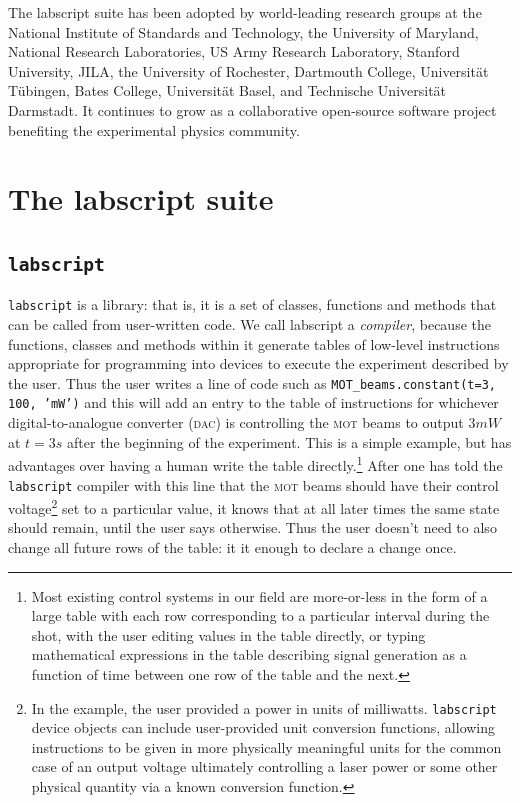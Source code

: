 The labscript suite has been adopted by world-leading research groups at the National Institute of Standards and Technology, the University of Maryland, National Research Laboratories, US Army Research Laboratory, Stanford University, JILA, the University of Rochester, Dartmouth College, Universit\"at T\"ubingen, Bates College, Universit\"at Basel, and Technische Universit\"at Darmstadt. It continues to grow as a collaborative open-source software project benefiting the experimental physics community.


\section{The labscript suite}


\subsection{\texttt{labscript}}

\texttt{labscript} is a library: that is, it is a set of classes, functions and methods that can be called from user-written code. We call labscript a \emph{compiler}, because the functions, classes and methods within it generate tables of low-level instructions appropriate for programming into devices to execute the experiment described by the user. Thus the user writes a line of code such as \hbox{\texttt{MOT\_beams.constant(t=3, 100, 'mW')}} and this will add an entry to the table of instructions for whichever digital-to-analogue converter (\textsc{dac}) is controlling the \textsc{mot} beams to output $3\unit{mW}$ at $t = 3\unit{s}$ after the beginning of the experiment. This is a simple example, but has advantages over having a human write the table directly.\footnote{Most existing control systems in our field are more-or-less in the form of a large table with each row corresponding to a particular interval during the shot, with the user editing values in the table directly, or typing mathematical expressions in the table describing signal generation as a function of time between one row of the table and the next.} After one has told the \texttt{labscript} compiler with this line that the \textsc{mot} beams should have their control voltage\footnote{In the example, the user provided a power in units of milliwatts. \texttt{labscript} device objects can include user-provided unit conversion functions, allowing instructions to be given in more physically meaningful units for the common case of an output voltage ultimately controlling a laser power or some other physical quantity via a known conversion function.} set to a particular value, it knows that at all later times the same state should remain, until the user says otherwise. Thus the user doesn't need to also change all future rows of the table: it it enough to declare a change once. 

